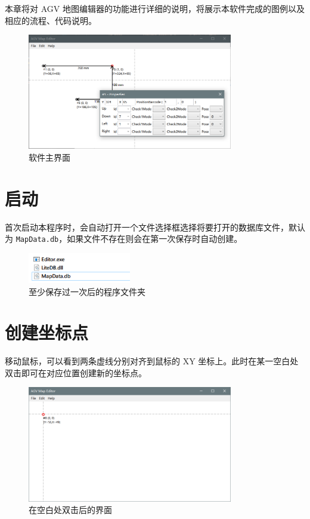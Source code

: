 
本章将对 AGV 地图编辑器的功能进行详细的说明，将展示本软件完成的图例以及相应的流程、代码说明。

\begin{figure}[H]
  \centering
  \includegraphics[width=0.8\textwidth]{assets/mainview.png}
  \caption{软件主界面}
  \label{fig:mainview}
\end{figure}

\section{启动}

首次启动本程序时，会自动打开一个文件选择框选择将要打开的数据库文件，默认为 \texttt{MapData.db}，如果文件不存在则会在第一次保存时自动创建。

\begin{figure}[H]
  \centering
  \includegraphics[width=0.4\textwidth]{assets/explorer.png}
  \caption{至少保存过一次后的程序文件夹}
  \label{fig:explorer}
\end{figure}

\section{创建坐标点}

移动鼠标，可以看到两条虚线分别对齐到鼠标的 XY 坐标上。此时在某一空白处双击即可在对应位置创建新的坐标点。

\begin{figure}[H]
  \centering
  \includegraphics[width=0.8\textwidth]{assets/dbclick.png}
  \caption{在空白处双击后的界面}
  \label{fig:dbclick}
\end{figure}

